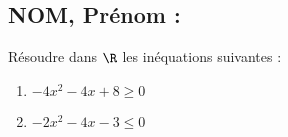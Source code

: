 \documentclass[a4paper,11pt,exos]{nsi} %
\begin{document}


\subsection*{NOM, Prénom : \dotfill} 

\maketitle

\begin{exercice}
    Résoudre dans $\R$ les inéquations suivantes :
    \begin{multicols}{2}
        \begin{enumerate}
            \item $-4x^2-4x+8\geq 0$
	        \item $-2x^2-4x-3\leq 0$
        \end{enumerate}
    \end{multicols}
    
\end{exercice}

\end{document}
